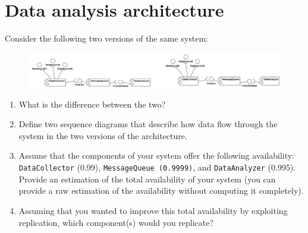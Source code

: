 \section{Data analysis architecture}

Consider the following two versions of the same system: 
\begin{figure}[H]
    \centering
    \includegraphics[width=0.9\linewidth]{images/da.png}
\end{figure}
\begin{enumerate}
    \item What is the difference between the two?
    \item Define two sequence diagrams that describe how data flow through the system in the two versions of the architecture. 
    \item Assume that the components of your system offer the following availability: \texttt{DataCollector} (0.99), \texttt{MessageQueue (0.9999)}, and \texttt{DataAnalyzer} (0.995). 
        Provide an estimation of the total availability of your system (you can provide a raw estimation of the availability without computing it completely).
    \item Assuming that you wanted to improve this total availability by exploiting replication, which component(s) would you replicate?
\end{enumerate}

